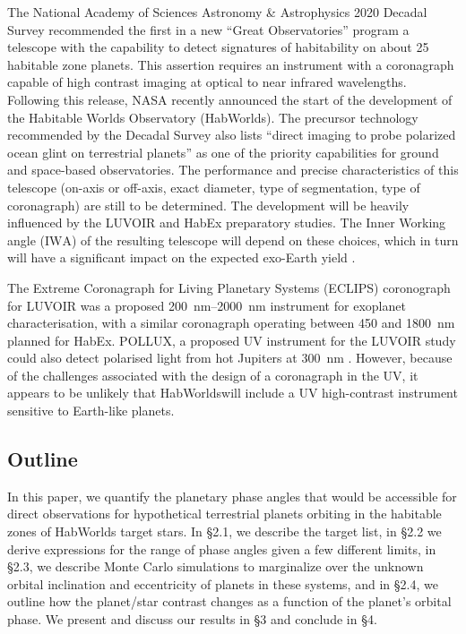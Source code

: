 \documentclass[
    usenatbib,
]{mnras}
\newcommand{\IWA}{\ensuremath{\mathrm{IWA}}}
\newcommand{\hwo}{HabWorlds}
\begin{document}
The National Academy of Sciences Astronomy \& Astrophysics 2020 Decadal Survey \citep{decadal} recommended the first in a new \enquote{Great Observatories} program a telescope with the capability to detect signatures of habitability on about 25 habitable zone planets.
%
This assertion requires an instrument with a coronagraph capable of high contrast imaging at optical to near infrared wavelengths.
%
Following this release, NASA recently announced the start of the development of the Habitable Worlds Observatory (\hwo).
%
The precursor technology recommended by the Decadal Survey also lists ``direct imaging to probe polarized ocean glint on terrestrial planets'' as one of the priority capabilities \citep[Box E.1 in][]{decadal} for ground and space-based observatories.
%
The performance and precise characteristics of this telescope (on-axis or off-axis, exact diameter, type of segmentation, type of coronagraph) are still to be determined.
%
The development will be heavily influenced by the LUVOIR \citep{LUVOIR2019} and HabEx \citep{HabEx_2020} preparatory studies.
%
The Inner Working angle (\IWA) of the resulting telescope will depend on these choices, which in turn will have a significant impact on the expected exo-Earth yield \citep{Stark2019_exoplanetyield}.

The Extreme Coronagraph for Living Planetary Systems (ECLIPS) coronograph for LUVOIR was a proposed \SIrange{200}{2000}{\nano\meter} instrument for exoplanet characterisation, with a similar coronagraph operating between \num{450} and \SI{1800}{\nano\meter} planned for HabEx.
%
POLLUX, a proposed UV instrument for the LUVOIR study could also detect  polarised light from hot Jupiters at \SI{300}{\nano\meter} \citep{Bouret2018_pollux}.
%
However, because of the challenges associated with the design of a coronagraph in the UV, it appears to be unlikely that \hwo will include a UV high-contrast instrument sensitive to Earth-like planets.


\subsection{Outline}

In this paper, we quantify the planetary phase angles that would be accessible for direct observations for hypothetical terrestrial planets orbiting in the habitable zones of HabWorlds target stars.
%
In \S 2.1, we describe the target list, in \S 2.2 we derive expressions for the range of phase angles given a few different limits, in \S 2.3, we describe Monte Carlo simulations to marginalize over the unknown orbital inclination and eccentricity of planets in these systems, and in \S 2.4, we outline how the planet/star contrast changes as a function of the planet's orbital phase.  
%
We present and discuss our results in \S 3 and conclude in \S 4. 
\end{document}

